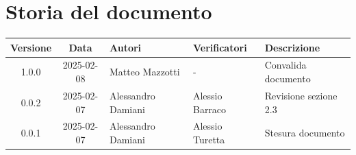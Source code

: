 \section*{Storia del documento}
\begin{tabularx}{\textwidth}{ c c p{3cm} p{3.17cm} X }
    \rowcolor{gray!20}\rule{0pt}{0.5cm}\textbf{Versione} & \textbf{Data} & \textbf{Autori} & \textbf{Verificatori} & \textbf{Descrizione} \\[0.7ex]
    
    \hline
    \rule{0pt}{0.5cm}1.0.0 & 2025-02-08 &  Matteo Mazzotti & - & Convalida documento\\[0.7ex] 
    \rule{0pt}{0.5cm}0.0.2 & 2025-02-07 &  Alessandro Damiani & Alessio Barraco & Revisione sezione 2.3\\[0.7ex] 
    \rule{0pt}{0.5cm}0.0.1 & 2025-02-07 &  Alessandro Damiani & Alessio Turetta & Stesura documento\\[0.7ex] 
\end{tabularx}